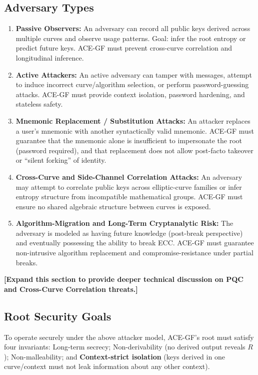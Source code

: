 \documentclass[11pt,a4paper]{article}
\begin{document}
\subsection{Adversary Types}
\begin{enumerate}
    \item \textbf{Passive Observers:} An adversary can record all public keys derived across multiple curves and observe usage patterns. Goal: infer the root entropy or predict future keys. ACE-GF must prevent cross-curve correlation and longitudinal inference.
    \item \textbf{Active Attackers:} An active adversary can tamper with messages, attempt to induce incorrect curve/algorithm selection, or perform password-guessing attacks. ACE-GF must provide context isolation, password hardening, and stateless safety.
    \item \textbf{Mnemonic Replacement / Substitution Attacks:} An attacker replaces a user's mnemonic with another syntactically valid mnemonic. ACE-GF must guarantee that the mnemonic alone is insufficient to impersonate the root (password required), and that replacement does not allow post-facto takeover or ``silent forking'' of identity.
    \item \textbf{Cross-Curve and Side-Channel Correlation Attacks:} An adversary may attempt to correlate public keys across elliptic-curve families or infer entropy structure from incompatible mathematical groups. ACE-GF must ensure no shared algebraic structure between curves is exposed.
    \item \textbf{Algorithm-Migration and Long-Term Cryptanalytic Risk:} The adversary is modeled as having future knowledge (post-break perspective) and eventually possessing the ability to break ECC. ACE-GF must guarantee non-intrusive algorithm replacement and compromise-resistance under partial breaks.
\end{enumerate}
\textbf{[Expand this section to provide deeper technical discussion on PQC and Cross-Curve Correlation threats.]}

\subsection{Root Security Goals}
To operate securely under the above attacker model, ACE-GF's root must satisfy four invariants: Long-term secrecy; Non-derivability (no derived output reveals $R$); Non-malleability; and \textbf{Context-strict isolation} (keys derived in one curve/context must not leak information about any other context).
\end{document}
